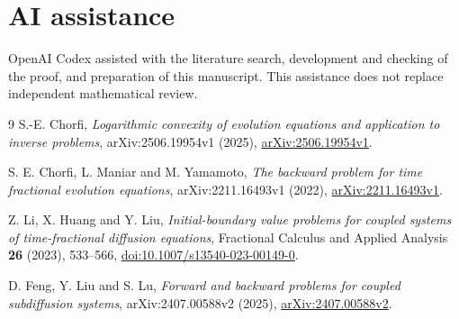 \documentclass[11pt]{article}
\begin{document}
\section*{AI assistance}
OpenAI Codex assisted with the literature search, development and checking
of the proof, and preparation of this manuscript. This assistance does not
replace independent mathematical review.

\begin{thebibliography}{9}
S.-E. Chorfi, \emph{Logarithmic convexity of evolution equations and application
to inverse problems}, arXiv:2506.19954v1 (2025),
\href{https://arxiv.org/abs/2506.19954v1}{arXiv:2506.19954v1}.

S. E. Chorfi, L. Maniar and M. Yamamoto, \emph{The backward problem for
time fractional evolution equations}, arXiv:2211.16493v1 (2022),
\href{https://arxiv.org/abs/2211.16493v1}{arXiv:2211.16493v1}.

Z. Li, X. Huang and Y. Liu, \emph{Initial-boundary value problems for coupled
systems of time-fractional diffusion equations}, Fractional Calculus and
Applied Analysis \textbf{26} (2023), 533--566,
\href{https://doi.org/10.1007/s13540-023-00149-0}{doi:10.1007/s13540-023-00149-0}.

D. Feng, Y. Liu and S. Lu, \emph{Forward and backward problems for coupled
subdiffusion systems}, arXiv:2407.00588v2 (2025),
\href{https://arxiv.org/abs/2407.00588v2}{arXiv:2407.00588v2}.
\end{thebibliography}
\end{document}
